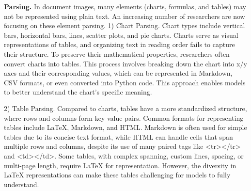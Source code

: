 \noindent \textbf{Parsing.} In document images, many elements (charts, formulas, and tables) may not be represented using plain text. An increasing number of researchers are now focusing on these element parsing. 
1) Chart Parsing. Chart types include vertical bars, horizontal bars, lines, scatter plots, and pie charts. Charts serve as visual representations of tables, and organizing text in reading order fails to capture their structure. To preserve their mathematical properties, researchers often convert charts into tables. This process involves breaking down the chart into x/y axes and their corresponding values, which can be represented in Markdown, CSV formats, or even converted into Python code. This approach enables models to better understand the chart's specific meaning.

2) Table Parsing. Compared to charts, tables have a more standardized structure, where rows and columns form key-value pairs. Common formats for representing tables include LaTeX, Markdown, and HTML. Markdown is often used for simple tables due to its concise text format, while HTML can handle cells that span multiple rows and columns, despite its use of many paired tags like <tr></tr> and <td></td>. Some tables, with complex spanning, custom lines, spacing, or multi-page length, require LaTeX for representation. However, the diversity in LaTeX representations can make these tables challenging for models to fully understand.

